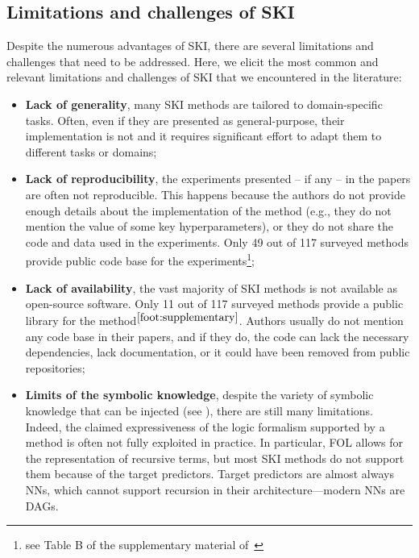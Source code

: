 \subsection[Limitations and challenges of SKI]{Limitations and challenges of \Gls{SKI}}\label{subsec:limitations-and-challenges-of-ski}
%
Despite the numerous advantages of \gls{SKI}, there are several limitations and challenges that need to be addressed.
%
Here, we elicit the most common and relevant limitations and challenges of \gls{SKI} that we encountered in the literature:
%
\begin{itemize}
    \item \textbf{Lack of generality}, many \gls{SKI} methods are tailored to domain-specific tasks.
    Often, even if they are presented as general-purpose, their implementation is not and it requires significant effort to adapt them to different tasks or domains;
    \item \textbf{Lack of reproducibility}, the experiments presented -- if any -- in the papers are often not reproducible.
    This happens because the authors do not provide enough details about the implementation of the method (e.g., they do not mention the value of some key hyperparameters), or they do not share the code and data used in the experiments.
    Only 49 out of 117 surveyed methods provide public code base for the experiments\footnote{\label{foot:supplementary}see Table B of the supplementary material of~\cite{DBLP:journals/csur/CiattoSAMO24}};
    \item \textbf{Lack of availability}, the vast majority of \gls{SKI} methods is not available as open-source software.
    Only 11 out of 117 surveyed methods provide a public library for the method$^{\ref{foot:supplementary}}$.
    Authors usually do not mention any code base in their papers, and if they do, the code can lack the necessary dependencies, lack documentation, or it could have been removed from public repositories;
    \item \textbf{Limits of the symbolic knowledge}, despite the variety of symbolic knowledge that can be injected (see ), there are still many limitations.
    Indeed, the claimed expressiveness of the logic formalism supported by a method is often not fully exploited in practice.
    In particular, \gls{FOL} allows for the representation of recursive terms, but most \gls{SKI} methods do not support them because of the target predictors.
    Target predictors are almost always \glspl{NN}, which cannot support recursion in their architecture---modern \glspl{NN} are \glspl{DAG}.
\end{itemize}

